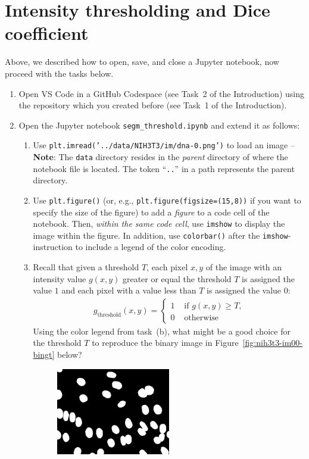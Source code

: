 \documentclass[12pt,a4paper]{article}
\begin{document}
\section{Intensity thresholding and Dice coefficient}
\label{task:threshold_segm}

Above, we described how to open, save, and close a Jupyter notebook, now proceed with the tasks below.
\begin{enumerate}
    \item Open VS Code in a GitHub Codespace (see Task~2 of the Introduction) using the repository which you created before (see Task~1 of the Introduction).
    \item Open the Jupyter notebook \texttt{segm\_threshold.ipynb} and extend it as follows:
    \begin{enumerate}
        \item Use \texttt{plt.imread('../data/NIH3T3/im/dna-0.png')} to load an image -- \textbf{Note}: The \texttt{data} directory resides in the \emph{parent} directory of where the notebook file is located. The token ``\texttt{..}'' in a path represents the parent directory.
        \item Use \texttt{plt.figure()} (or, e.g., \texttt{plt.figure(figsize=(15,8))} if you want to specify the size of the figure) to add a \emph{figure} to a code cell of the notebook. Then, \emph{within the same code cell}, use \texttt{imshow} to display the image within the figure. In addition, use \texttt{colorbar()} after the \texttt{imshow}-instruction to include a legend of the color encoding.
        \item Recall that given a threshold $T$, each pixel $x,y$ of the image with an intensity value $g\left(x,y\right)$ greater or equal the threshold $T$ is assigned the value $1$ and each pixel with a value less than $T$ is assigned the value $0$:
        \begin{align*}
            g_\text{threshold}\left(x,y\right) = \begin{cases}
                1 & \text{ if $g\left(x,y\right) \geq T$,} \\
                0 & \text{ otherwise}
            \end{cases}
        \end{align*}
        Using the color legend from task~(b), what might be a good choice for the threshold $T$ to reproduce the binary image in Figure~\ref{fig:nih3t3-im00-bingt} below?
        \begin{figure}[h!]
            \centering
            \includegraphics[width=0.5\textwidth]{images/nih3t3-im00-bingt.png}

\end{figure}
\end{enumerate}
\end{enumerate}
\end{document}
